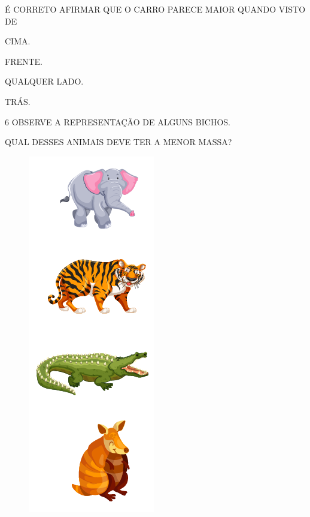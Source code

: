É CORRETO AFIRMAR QUE O CARRO PARECE MAIOR QUANDO VISTO DE

\begin{escolha}[itemsep=0pt]
\item CIMA.

\item FRENTE.

\item QUALQUER LADO.

\item TRÁS.
\end{escolha}

\pagebreak
\num{6} OBSERVE A REPRESENTAÇÃO DE ALGUNS BICHOS.


QUAL DESSES ANIMAIS DEVE TER A MENOR MASSA?

\begin{figure}[htpb!]
\includegraphics[width=.45\textwidth]{./media/SAEB_1ANO_MAT_FIGURA131.png}
\end{figure}

